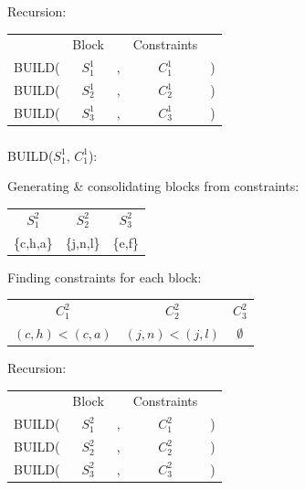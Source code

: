 \documentclass[11pt]{article} %
\begin{document}
\begin{center}
	Recursion:
	
	\begin{tabular}{c c c c c}
		 & Block & & Constraints & \\
		BUILD( & $S_1^1$ & , & $C_1^1$ & ) \\
		BUILD( & $S_2^1$ & , & $C_2^1$ & ) \\
		BUILD( & $S_3^1$ & , & $C_3^1$ & )
	\end{tabular}
	\end{center}


\subsubsection{}

	\hspace{0.5cm}BUILD($S_1^1$, $C_1^1$):
		\begin{center}
		Generating \& consolidating blocks from constraints:
		
		\begin{tabular}{c c c}
			\hspace{0.8cm}$S_1^2$\hspace{0.8cm} & \hspace{0.8cm}$S_2^2$\hspace{0.8cm} & \hspace{0.8cm}$S_3^2$\hspace{0.8cm} \\
			\{c,h,a\} & \{j,n,l\} & \{e,f\}
		\end{tabular}
	
		Finding constraints for each block:
		
		\begin{tabular}{c c c}
			\hspace{0.8cm}$C_1^2$\hspace{0.8cm} & \hspace{0.8cm}$C_2^2$\hspace{0.8cm} & \hspace{0.8cm}$C_3^2$\hspace{0.8cm} \\
			$(c,h)<(c,a)$ & $(j,n)<(j,l)$ & $\emptyset$
		\end{tabular}

		Recursion:
		
		\begin{tabular}{c c c c c}
			 & Block & & Constraints & \\
			BUILD( & $S_1^2$ & , & $C_1^2$ & ) \\
			BUILD( & $S_2^2$ & , & $C_2^2$ & ) \\
			BUILD( & $S_3^2$ & , & $C_3^2$ & )
		\end{tabular}
		\end{center}
\end{document}
